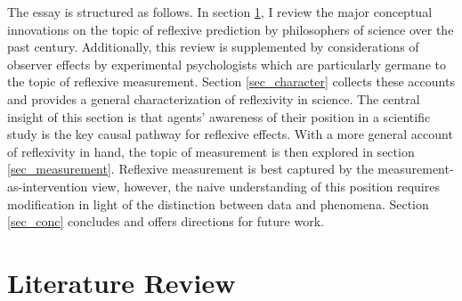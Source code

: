 
The essay is structured as follows. In section \ref{sec_lit}, I review the major conceptual innovations on the topic of reflexive prediction by philosophers of science over the past century. Additionally, this review is supplemented by considerations of observer effects by experimental psychologists which are particularly germane to the topic of reflexive measurement. Section \ref{sec_character} collects these accounts and provides a general characterization of reflexivity in science. The central insight of this section is that agents' awareness of their position in a scientific study is the key causal pathway for reflexive effects. With a more general account of reflexivity in hand, the topic of measurement is then explored in section \ref{sec_measurement}. Reflexive measurement is best captured by the measurement-as-intervention view, however, the naive understanding of this position requires modification in light of the distinction between data and phenomena. Section \ref{sec_conc} concludes and offers directions for future work.

\section{Literature Review}\label{sec_lit}

